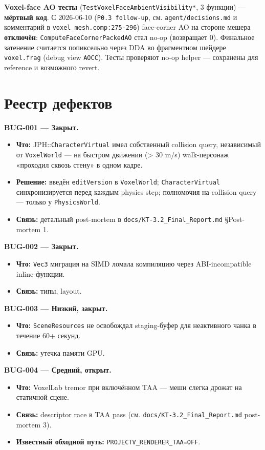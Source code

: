 \textbf{Voxel-face AO тесты} (\texttt{TestVoxelFaceAmbientVisibility*}, 3 функции) --- \textbf{мёртвый код}. С 2026-06-10 (\texttt{P0.3\ follow-up}, см. \texttt{agent/decisions.md} и комментарий в \texttt{voxel\_mesh.comp:275-296}) face-corner AO на стороне мешера \textbf{отключён}: \texttt{ComputeFaceCornerPackedAO} стал no-op (возвращает 0). Финальное затенение считается попиксельно через DDA во фрагментном шейдере \texttt{voxel.frag} (debug view \texttt{AOCC}). Тесты проверяют no-op helper --- сохранены для reference и возможного revert.

\section{Реестр дефектов}\label{KT-2.2_Test_Report-ux440ux435ux435ux441ux442ux440-ux434ux435ux444ux435ux43aux442ux43eux432}

\textbf{BUG-001 --- Закрыт.}

\begin{itemize}
\tightlist
\item
  \textbf{Что:} JPH::\texttt{CharacterVirtual} имел собственный collision query, независимый от \texttt{VoxelWorld} --- на быстром движении (\textgreater{} 30 m/s) walk-персонаж «проходил сквозь стену» в одном кадре.
\item
  \textbf{Решение:} введён \texttt{editVersion} в \texttt{VoxelWorld}; \texttt{CharacterVirtual} синхронизируется перед каждым physics step; полномочия на collision query --- только у \texttt{PhysicsWorld}.
\item
  \textbf{Связь:} детальный post-mortem в \texttt{docs/KT-3.2\_Final\_Report.md} §Post-mortem 1.
\end{itemize}

\textbf{BUG-002 --- Закрыт.}

\begin{itemize}
\tightlist
\item
  \textbf{Что:} \texttt{Vec3} миграция на SIMD ломала компиляцию через ABI-incompatible inline-функции.
\item
  \textbf{Связь:} типы, layout.
\end{itemize}

\textbf{BUG-003 --- Низкий, закрыт.}

\begin{itemize}
\tightlist
\item
  \textbf{Что:} \texttt{SceneResources} не освобождал staging-буфер для неактивного чанка в течение 60+ секунд.
\item
  \textbf{Связь:} утечка памяти GPU.
\end{itemize}

\textbf{BUG-004 --- Средний, открыт.}

\begin{itemize}
\tightlist
\item
  \textbf{Что:} VoxelLab tremor при включённом TAA --- меши слегка дрожат на статичной сцене.
\item
  \textbf{Связь:} descriptor race в TAA pass (см. \texttt{docs/KT-3.2\_Final\_Report.md} post-mortem 3).
\item
  \textbf{Известный обходной путь:} \texttt{PROJECTV\_RENDERER\_TAA=OFF}.
\end{itemize}


